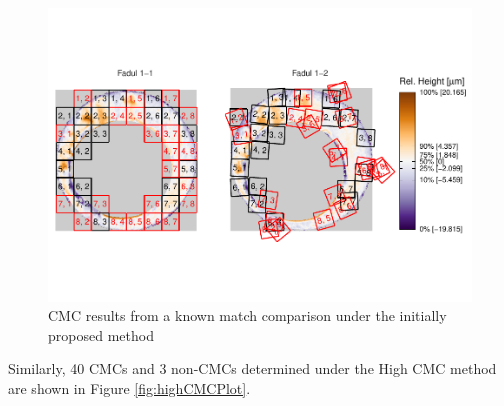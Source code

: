 \begin{Schunk}
\begin{figure}[htbp]

{\centering \includegraphics[width=1.2\textwidth,trim={0 2.5cm 0 2cm}]{cmcR_files/figure-latex/unnamed-chunk-13-1} 

}

\caption{\label{fig:initialCMCPlot} CMC results from a known match comparison under the initially proposed method}\label{fig:unnamed-chunk-13}
\end{figure}
\end{Schunk}

Similarly, 40 CMCs and 3 non-CMCs determined under the High CMC method
are shown in Figure \ref{fig:highCMCPlot}.

\begin{Schunk}
\end{Schunk}

